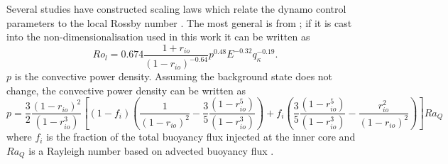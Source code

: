 Several studies have constructed scaling laws which relate the dynamo control parameters to the local Rossby number \citep{christensen06scaling,OlsonandChristensen2006,aubert2009}. The most general is from \citet{aubert2009}; if it is cast into the non-dimensionalisation used in this work it can be written as
\begin{equation}
Ro_{l}=0.674\frac{1+r_{io}}{\left(1-r_{io}\right)^{-0.64}}p^{0.48}E^{-0.32}q_{\kappa}^{-0.19}.
\label{eq:rolscaling}
\end{equation}
$p$ is the convective power density. Assuming the background state does not change, the convective power density can be written as
\begin{equation}
p=\frac{3}{2}\frac{(1-r_{io})^2}{\left(1-r_{io}^3\right)} \left[(1-f_{i})\left(\frac{1}{(1-r_{io})^2}-\frac{3}{5}\frac{\left(1-r_{io}^5\right)}{\left(1-r_{io}^3\right)}\right)+f_{i} \left(\frac{3}{5}\frac{\left(1-r_{io}^5\right)}{\left(1-r_{io}^3\right)}-\frac{r_{io}^2}{(1-r_{io})^2}\right)\right]Ra_Q
\end{equation}
where $f_i$ is the fraction of the total buoyancy flux injected at the inner core and $Ra_Q$ is a Rayleigh number based on advected buoyancy flux \citep{aubert2009}.

